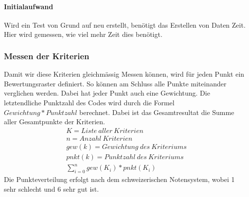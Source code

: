 \paragraph{Initialaufwand}
Wird ein Test von Grund auf neu erstellt, benötigt das Erstellen von Daten Zeit. Hier wird gemessen, wie viel mehr Zeit dies benötigt.
\subsubsection{Messen der Kriterien}
Damit wir diese Kriterien gleichmässig Messen können, wird für jeden Punkt ein Bewertungsraster definiert. So können am Schluss alle Punkte miteinander verglichen werden. Dabei hat jeder Punkt auch eine Gewichtung. Die letztendliche Punktzahl des Codes wird durch die Formel \(Gewichtung * Punktzahl\) berechnet. Dabei ist das Gesamtresultat die Summe aller Gesamtpunkte der Kriterien.
\begin{equation}
\begin{split}
K = Liste\ aller\ Kriterien\\
n = Anzahl\ Kriterien\\
gew(k) = Gewichtung\ des\ Kriteriums\\
pnkt(k) = Punktzahl\ des\ Kriteriums\\
\displaystyle\sum_{i=0}^{n} gew(K_{i}) * pnkt(K_{i})
\end{split}
\end{equation}
Die Punkteverteilung erfolgt nach dem schweizerischen Notensystem, wobei 1 sehr schlecht und 6 sehr gut ist.

